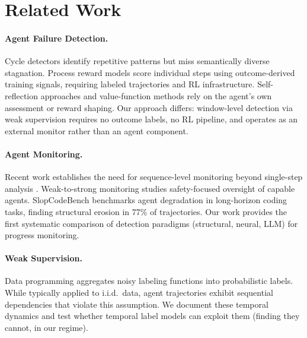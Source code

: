 \documentclass[11pt,a4paper]{article}
\begin{document}
\section{Related Work}
\label{sec:related}

\paragraph{Agent Failure Detection.}
Cycle detectors identify repetitive patterns \cite{zhuge2024cdcs,specra2025,trajad2025} but miss semantically diverse stagnation.
Process reward models \cite{xi2026agentprm,prm2025framework,toolprmbench2026,trajreward2026} score individual steps using outcome-derived training signals, requiring labeled trajectories and RL infrastructure.
Self-reflection approaches \cite{shinn2023reflexion,yao2023tree} and value-function methods \cite{le2022coderl} rely on the agent's own assessment or reward shaping.
Our approach differs: window-level detection via weak supervision requires no outcome labels, no RL pipeline, and operates as an external monitor rather than an agent component.

\paragraph{Agent Monitoring.}
Recent work establishes the need for sequence-level monitoring beyond single-step analysis \cite{monitorharm2025}.
Weak-to-strong monitoring \cite{weakstrong2025} studies safety-focused oversight of capable agents.
SlopCodeBench \cite{slopcodebench2026} benchmarks agent degradation in long-horizon coding tasks, finding structural erosion in 77\% of trajectories.
Our work provides the first systematic comparison of detection paradigms (structural, neural, LLM) for progress monitoring.

\paragraph{Weak Supervision.}
Data programming \cite{ratner2016data,ratner2020snorkel} aggregates noisy labeling functions into probabilistic labels.
While typically applied to i.i.d.\ data, agent trajectories exhibit sequential dependencies that violate this assumption.
We document these temporal dynamics and test whether temporal label models can exploit them (finding they cannot, in our regime).
\end{document}
